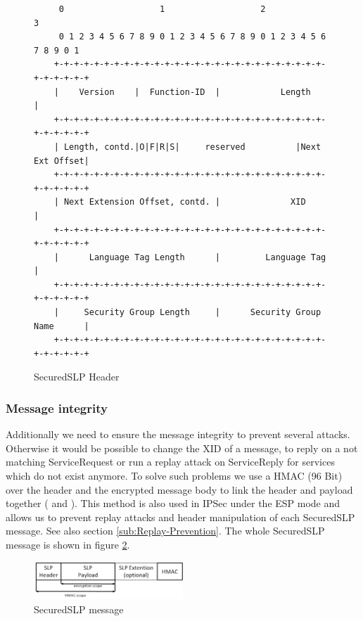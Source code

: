 \begin{figure}[!h]
\begin{lstlisting}
	 0                   1                   2                   3
	 0 1 2 3 4 5 6 7 8 9 0 1 2 3 4 5 6 7 8 9 0 1 2 3 4 5 6 7 8 9 0 1
	+-+-+-+-+-+-+-+-+-+-+-+-+-+-+-+-+-+-+-+-+-+-+-+-+-+-+-+-+-+-+-+-+
	|    Version    |  Function-ID  |            Length             |
	+-+-+-+-+-+-+-+-+-+-+-+-+-+-+-+-+-+-+-+-+-+-+-+-+-+-+-+-+-+-+-+-+
	| Length, contd.|O|F|R|S|     reserved          |Next Ext Offset|
	+-+-+-+-+-+-+-+-+-+-+-+-+-+-+-+-+-+-+-+-+-+-+-+-+-+-+-+-+-+-+-+-+
	| Next Extension Offset, contd. |              XID              |
	+-+-+-+-+-+-+-+-+-+-+-+-+-+-+-+-+-+-+-+-+-+-+-+-+-+-+-+-+-+-+-+-+
	|      Language Tag Length      |         Language Tag          |
	+-+-+-+-+-+-+-+-+-+-+-+-+-+-+-+-+-+-+-+-+-+-+-+-+-+-+-+-+-+-+-+-+
	|     Security Group Length     |      Security Group Name      |
	+-+-+-+-+-+-+-+-+-+-+-+-+-+-+-+-+-+-+-+-+-+-+-+-+-+-+-+-+-+-+-+-+
\end{lstlisting}
\caption{SecuredSLP Header}
\label{fig:sslp-header}
\end{figure}

\subsubsection{Message integrity}
Additionally we need to ensure the message integrity to prevent several attacks. Otherwise it would be possible to change the XID of a message, to reply on a not matching ServiceRequest or run a replay attack on ServiceReply for services which do not exist anymore. To solve such problems we use a HMAC (96 Bit) over the header and the encrypted message body to link the header and payload together (\cite{Kraw97} and \cite{Kero00}). This method is also used in IPSec under the ESP mode and allows us to prevent replay attacks and header manipulation of each SecuredSLP message. See also section \ref{sub:Replay-Prevention}. The whole SecuredSLP message is shown in figure \ref{fig:sslp-message}.
\begin{figure}[!h]
\centering\includegraphics[width=0.5\textwidth]{Images/HMAC}
\caption{SecuredSLP message}
\label{fig:sslp-message}
\end{figure}

